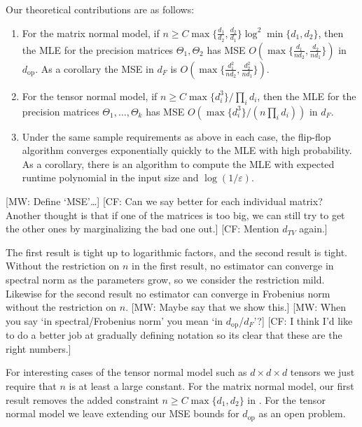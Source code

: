 \documentclass[aos]{imsart}
\theoremstyle{definition}
\DeclareMathOperator{\op}{op}
\newcommand{\eps}{\varepsilon}
\newcommand{\CF}[1]{{\color{purple}[CF: #1]}}
\newcommand{\MW}[1]{{\color{red}[MW: #1]}}
\begin{document}
Our theoretical contributions are as follows:
\begin{enumerate}
\item For the matrix normal model, if $n \geq C \max\{\frac{d_1}{d_2},\frac{d_2}{d_1}\} \log^2 \min\{d_1,d_2\}$, then the MLE for the precision matrices $\Theta_1, \Theta_2$ has MSE $O( \max\{ \frac{d_1}{nd_2}, \frac{d_2}{nd_1} \} )$ in $d_{\op}$.
As a corollary the MSE in $d_F$ is $O( \max \{ \frac{d_1^2}{nd_2}, \frac{d_2^2}{nd_1} \} )$.
\item For the tensor normal model, if $n \geq C \max\{d_i^3\}/ \prod_i d_i$, then the MLE for the precision matrices $\Theta_1, \dots, \Theta_k$ has MSE $O(\max \{ d_i^3 \} / (n \prod_i d_i ) )$ in $d_F$.
\item Under the same sample requirements as above in each case, the flip-flop algorithm converges exponentially quickly to the MLE with high probability. As a corollary, there is an algorithm to compute the MLE with expected runtime polynomial in the input size and $\log(1/\eps)$.
\end{enumerate}
\MW{Define `MSE'\dots}
\CF{Can we say better for each individual matrix? Another thought is that if one of the matrices is too big, we can still try to get the other ones by marginalizing the bad one out.}
\CF{Mention $d_{TV}$ again.}

The first result is tight up to logarithmic factors, and the second result is tight.
Without the restriction on $n$ in the first result, no estimator can converge in spectral norm as the parameters grow, so we consider the restriction mild. Likewise for the second result no estimator can converge in Frobenius norm without the restriction on $n$.
\MW{Maybe say that we show this.}
\MW{When you say `in spectral/Frobenius norm' you mean `in $d_{\op}$/$d_F$'?}
\CF{I think I'd like to do a better job at gradually defining notation so its clear that these are the right numbers.}

For interesting cases of the tensor normal model such as $d\times d \times d$ tensors we just require that $n$ is at least a large constant.
For the matrix normal model, our first result removes the added constraint $n \geq C \max\{d_1,d_2\}$ in \cite{tsiligkaridis2013convergence}.
For the tensor normal model we leave extending our MSE bounds for $d_{\op}$ as an open problem.
\end{document}
